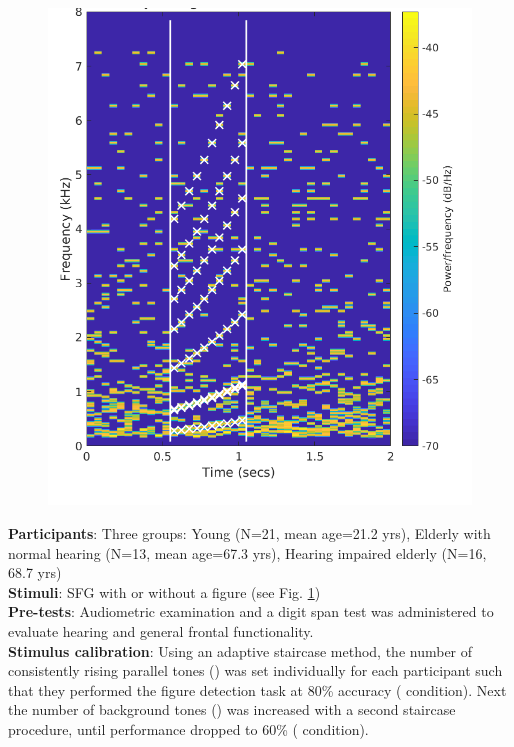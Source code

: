 \documentclass[a0,landscape]{a0poster}
\begin{document}
\begin{multicols}{3}
\setlength{\columnsep}{60pt}
\begin{figure}
	\begin{center}
		\includegraphics[width=1\linewidth]{sfg_stimulus.png}
		\label{fig:stimulus}
	\end{center}
\end{figure}

\textbf{Participants}: Three groups: Young (N=21, mean age=21.2 yrs), Elderly with normal hearing (N=13, mean age=67.3 yrs), Hearing impaired elderly (N=16, 68.7 yrs)\\
\textbf{Stimuli}: SFG with or without a figure (see Fig. \ref{fig:stimulus})\\
\textbf{Pre-tests}: Audiometric examination and a digit span test was administered to evaluate hearing and general frontal functionality.\\
\textbf{Stimulus calibration}: Using an adaptive staircase method, the number of consistently rising parallel tones () was set individually for each participant such that they performed the figure detection task at 80\% accuracy ( condition). Next the number of background
tones () was increased with a second staircase procedure, until
performance dropped to 60\% ( condition).


\end{multicols}
\end{document}
